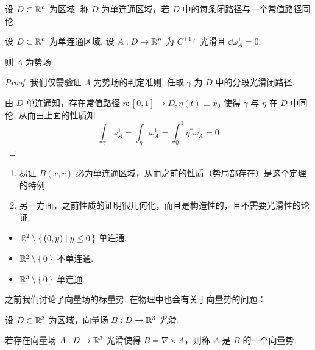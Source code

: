 \begin{definition}
    设 $D\subset\mathbb{R}^n$ 为区域. 称 $D$ 为单连通区域，若 $D$ 中的每条闭路径与一个常值路径同伦.
\end{definition}

\begin{theorem}
    设 $D\subset\mathbb{R}^n$ 为单连通区域. 设 $A:D\to\mathbb{R}^n$ 为 $C^{(1)}$ 光滑且 $\dd\omega_A^1=0$.
    
    则 $A$ 为势场.
\end{theorem}
\begin{proof}
    我们仅需验证 $A$ 为势场的判定准则. 任取 $\gamma$ 为 $D$ 中的分段光滑闭路径.

    由 $D$ 单连通知，存在常值路径 $\eta:[0,1]\to D,\eta(t)\equiv x_0$ 使得 $\gamma$ 与 $\eta$ 在 $D$ 中同伦. 从而由上面的性质知
$$
\int_\gamma\omega_A^1=\int_\eta\omega_A^1=\int_0^1\eta^*\omega_A^1=0
$$
\end{proof}

\begin{hint}
    \begin{enumerate}
        \item 易证 $B(x,r)$ 必为单连通区域，从而之前的性质（势局部存在）是这个定理的特例.
        
        \item 另一方面，之前性质的证明很几何化，而且是构造性的，且不需要光滑性的论证.
    \end{enumerate}
\end{hint}

\begin{example}
    \begin{itemize}
        \item $\mathbb{R}^2\setminus\set{(0,y)|y\le 0}$ 单连通.
        
        \item $\mathbb{R}^2\setminus\set{0}$ 不单连通.
        
        \item $\mathbb{R}^3\setminus\set{0}$ 单连通.
    \end{itemize}
\end{example}


之前我们讨论了向量场的标量势. 在物理中也会有关于向量势的问题：

\begin{definition}
    设 $D\subset\mathbb{R}^3$ 为区域，向量场 $B:D\to\mathbb{R}^3$ 光滑.

    若存在向量场 $A:D\to\mathbb{R}^3$ 光滑使得 $B=\nabla\times A$，则称 $A$ 是 $B$ 的一个向量势.
\end{definition}


